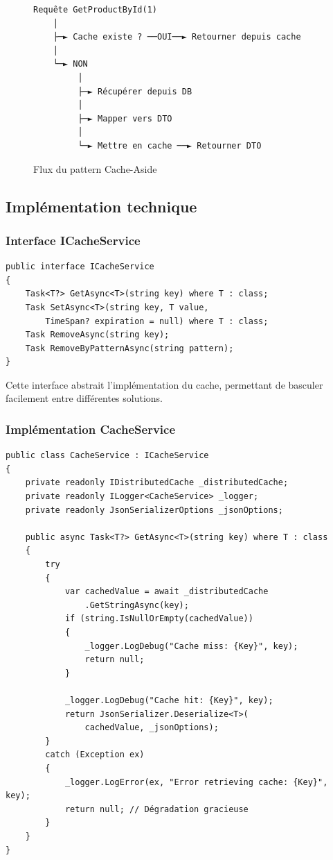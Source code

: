 \documentclass[12pt,a4paper]{article}
\begin{document}
\begin{figure}[H]
\centering
\begin{verbatim}
Requête GetProductById(1)
    │
    ├─► Cache existe ? ──OUI──► Retourner depuis cache
    │
    └─► NON
         │
         ├─► Récupérer depuis DB
         │
         ├─► Mapper vers DTO
         │
         └─► Mettre en cache ──► Retourner DTO
\end{verbatim}
\caption{Flux du pattern Cache-Aside}
\end{figure}

\subsection{Implémentation technique}

\subsubsection{Interface ICacheService}

\begin{lstlisting}[caption=Interface du service de cache, float=h!]
public interface ICacheService
{
    Task<T?> GetAsync<T>(string key) where T : class;
    Task SetAsync<T>(string key, T value, 
        TimeSpan? expiration = null) where T : class;
    Task RemoveAsync(string key);
    Task RemoveByPatternAsync(string pattern);
}
\end{lstlisting}

Cette interface abstrait l'implémentation du cache, permettant de basculer facilement entre différentes solutions.

\subsubsection{Implémentation CacheService}

\begin{lstlisting}[caption=Implémentation avec IDistributedCache, float=h!]
public class CacheService : ICacheService
{
    private readonly IDistributedCache _distributedCache;
    private readonly ILogger<CacheService> _logger;
    private readonly JsonSerializerOptions _jsonOptions;

    public async Task<T?> GetAsync<T>(string key) where T : class
    {
        try
        {
            var cachedValue = await _distributedCache
                .GetStringAsync(key);
            if (string.IsNullOrEmpty(cachedValue))
            {
                _logger.LogDebug("Cache miss: {Key}", key);
                return null;
            }

            _logger.LogDebug("Cache hit: {Key}", key);
            return JsonSerializer.Deserialize<T>(
                cachedValue, _jsonOptions);
        }
        catch (Exception ex)
        {
            _logger.LogError(ex, "Error retrieving cache: {Key}", key);
            return null; // Dégradation gracieuse
        }
    }
}
\end{lstlisting}
\end{document}
